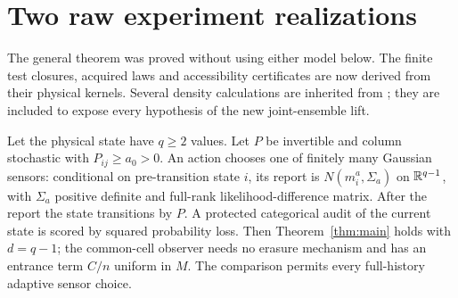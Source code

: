 \section{Two raw experiment realizations}\label{sec:realizations}
The general theorem was proved without using either model below. The finite test closures, acquired laws and accessibility certificates are now derived from their physical kernels. Several density calculations are inherited from \cite{GTFBayes,GTFControlled,GTFStationary}; they are included to expose every hypothesis of the new joint-ensemble lift.

\begin{theorem}\label{thm:gaussian}
Let the physical state have $q\ge2$ values. Let $P$ be invertible and column stochastic with $P_{ij}\ge a_0>0$. An action chooses one of finitely many Gaussian sensors: conditional on pre-transition state $i$, its report is $N(m_i^a,\Sigma_a)$ on $\mathbb R^{q-1}$, with $\Sigma_a$ positive definite and full-rank likelihood-difference matrix. After the report the state transitions by $P$. A protected categorical audit of the current state is scored by squared probability loss. Then Theorem~\ref{thm:main} holds with $d=q-1$; the common-cell observer needs no erasure mechanism and has an entrance term $C/n$ uniform in $M$. The comparison permits every full-history adaptive sensor choice.
\end{theorem}
